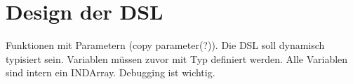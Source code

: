 
\chapter{Design der DSL}
Funktionen mit Parametern (copy parameter(?)).
Die \ac{DSL} soll dynamisch typisiert sein.
Variablen müssen zuvor mit Typ definiert werden.
Alle Variablen sind intern ein INDArray.
Debugging ist wichtig.

\endinput
